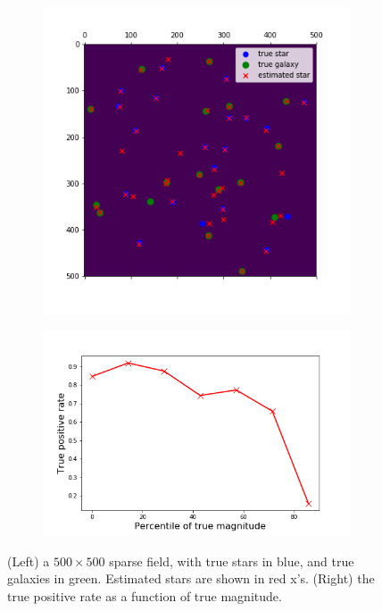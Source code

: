 \begin{figure}
    \centering
    \begin{subfigure}[!t]{0.45\textwidth}
        \includegraphics[width=\textwidth]{figures/sparse_field_detections.png}
        \label{fig:sparse_field_detect}
    \end{subfigure}
    \begin{subfigure}[!t]{0.54\textwidth}
        \includegraphics[width=\textwidth]{figures/sparse_field_tpr.png}
        \label{fig:sparse_field_tpr}
    \end{subfigure}
    \caption{(Left) a $500\times 500$ sparse field, with true stars in 
    blue, and true galaxies in green. Estimated stars are shown in red x's. 
    (Right) the true positive rate as a function of true magnitude. }
    \label{fig:sparse_field}
\end{figure}
